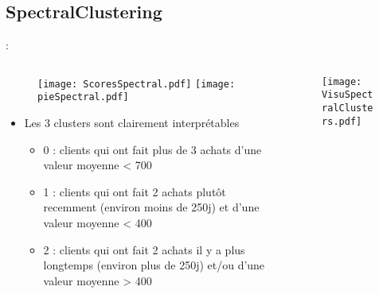 \documentclass[8pt,aspectratio=169,hyperref={unicode=true}]{beamer}
\begin{document}
\subsection{SpectralClustering}
\begin{frame}{\insertsection: \insertsubsection}
    \begin{columns}
        \begin{column}{.55\textwidth}
            \begin{figure}
                \texttt{[image: ScoresSpectral.pdf]}
                \texttt{[image: pieSpectral.pdf]}
            \end{figure}
            \begin{itemize}
                \item Les 3 clusters sont clairement interprétables
                \begin{itemize}
                    \item 0 : clients qui ont fait plus de 3 achats d'une valeur moyenne < 700
                    \item 1 : clients qui ont fait 2 achats plutôt recemment (environ moins de 250j) et d'une valeur moyenne < 400
                    \item 2 : clients qui ont fait 2 achats il y a plus longtemps (environ plus de 250j) et/ou d'une valeur moyenne > 400
                \end{itemize}
            \end{itemize}
        \end{column}
        \begin{column}{.45\textwidth}
            \begin{figure}
                \texttt{[image: VisuSpectralClusters.pdf]}
            \end{figure}
        \end{column}
    \end{columns}
\end{frame}
\end{document}
